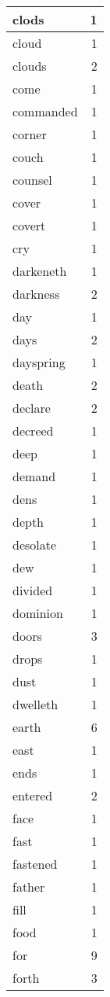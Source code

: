 \begin{center}
\begin{longtable}{l|r}
clods & 1 \\ \hline
cloud & 1 \\ \hline
clouds & 2 \\ \hline
come & 1 \\ \hline
commanded & 1 \\ \hline
corner & 1 \\ \hline
couch & 1 \\ \hline
counsel & 1 \\ \hline
cover & 1 \\ \hline
covert & 1 \\ \hline
cry & 1 \\ \hline
darkeneth & 1 \\ \hline
darkness & 2 \\ \hline
day & 1 \\ \hline
days & 2 \\ \hline
dayspring & 1 \\ \hline
death & 2 \\ \hline
declare & 2 \\ \hline
decreed & 1 \\ \hline
deep & 1 \\ \hline
demand & 1 \\ \hline
dens & 1 \\ \hline
depth & 1 \\ \hline
desolate & 1 \\ \hline
dew & 1 \\ \hline
divided & 1 \\ \hline
dominion & 1 \\ \hline
doors & 3 \\ \hline
drops & 1 \\ \hline
dust & 1 \\ \hline
dwelleth & 1 \\ \hline
earth & 6 \\ \hline
east & 1 \\ \hline
ends & 1 \\ \hline
entered & 2 \\ \hline
face & 1 \\ \hline
fast & 1 \\ \hline
fastened & 1 \\ \hline
father & 1 \\ \hline
fill & 1 \\ \hline
food & 1 \\ \hline
for & 9 \\ \hline
forth & 3 \\ \hline

\end{longtable}
\end{center}

